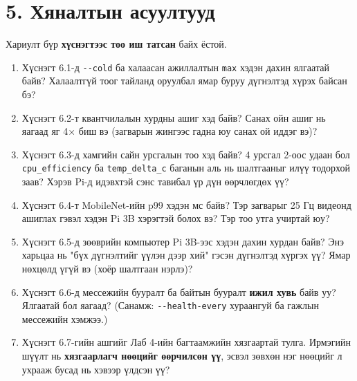 \begin{Shaded}
\begin{Highlighting}[]
\KeywordTok{\&\&} 
\end{Highlighting}
\end{Shaded}

\hypertarget{ux445ux44fux43dux430ux43bux442ux44bux43d-ux430ux441ux443ux443ux43bux442ux443ux443ux434}{%
\section{5. Хяналтын асуултууд}\label{ux445ux44fux43dux430ux43bux442ux44bux43d-ux430ux441ux443ux443ux43bux442ux443ux443ux434}}

Хариулт бүр \textbf{хүснэгтээс тоо иш татсан} байх ёстой.

\begin{enumerate}
\def\labelenumi{\arabic{enumi}.}
\item
  Хүснэгт 6.1-д \texttt{-\/-cold} ба халаасан ажиллалтын \texttt{max} хэдэн дахин ялгаатай байв? Халаалтгүй тоог тайланд оруулбал ямар буруу дүгнэлтэд хүрэх байсан бэ?
\item
  Хүснэгт 6.2-т квантчилалын хурдны ашиг хэд байв? Санах ойн ашиг нь яагаад яг 4× биш вэ (загварын жингээс гадна юу санах ой иддэг вэ)?
\item
  Хүснэгт 6.3-д хамгийн сайн урсгалын тоо хэд байв? 4 урсгал 2-оос удаан бол \texttt{cpu\_efficiency} ба \texttt{temp\_\allowbreak{}delta\_\allowbreak{}c} баганын аль нь шалтгааныг илүү тодорхой заав? Хэрэв Pi-д идэвхтэй сэнс тавибал үр дүн өөрчлөгдөх үү?
\item
  Хүснэгт 6.4-т MobileNet-ийн p99 хэдэн мс байв? Тэр загварыг 25 Гц видеонд ашиглах гэвэл хэдэн Pi 3B хэрэгтэй болох вэ? Тэр тоо утга учиртай юу?
\item
  Хүснэгт 6.5-д зөөврийн компьютер Pi 3B-ээс хэдэн дахин хурдан байв? Энэ харьцаа нь "бүх дүгнэлтийг үүлэн дээр хий" гэсэн дүгнэлтэд хүргэх үү? Ямар нөхцөлд үгүй вэ (хоёр шалтгаан нэрлэ)?
\item
  Хүснэгт 6.6-д мессежийн бууралт ба байтын бууралт \textbf{ижил хувь} байв уу? Ялгаатай бол яагаад? (Санамж: \texttt{-\/-health-every} хураангуй ба гажлын мессежийн хэмжээ.)
\item
  Хүснэгт 6.7-гийн ашгийг Лаб 4-ийн багтаамжийн хязгаартай тулга. Ирмэгийн шүүлт нь \textbf{хязгаарлагч нөөцийг өөрчилсөн үү}, эсвэл зөвхөн нэг нөөцийг л ухрааж бусад нь хэвээр үлдсэн үү?
\end{enumerate}

